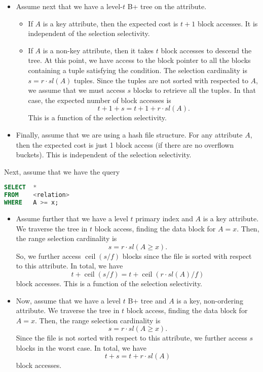 \documentclass[a4paper, openany]{memoir}
\theoremstyle{definition}
\theoremstyle{plain}
\begin{document}
\begin{itemize}
    \item Assume next that we have a level-$t$ B+ tree on the attribute.
    \begin{itemize}
        \item If $A$ is a key attribute, then the expected cost is $t + 1$ block accesses. It is independent of the selection selectivity.
        \item If $A$ is a non-key attribute, then it takes $t$ block accesses to descend the tree. At this point, we have access to the block pointer to all the blocks containing a tuple satisfying the condition. The selection cardinality is $s = r \cdot \textit{sl}(A)$ tuples. Since the tuples are not sorted with respected to $A$, we assume that we must access $s$ blocks to retrieve all the tuples. In that case, the expected number of block accesses is
        \[t + 1 + s = t + 1 + r \cdot \textit{sl}(A).\]
        This is a function of the selection selectivity.
    \end{itemize}

    \item Finally, assume that we are using a hash file structure. For any attribute $A$, then the expected cost is just 1 block access (if there are no overflown buckets). This is independent of the selection selectivity.
\end{itemize}

Next, assume that we have the query
\begin{lstlisting}[language=SQL]
SELECT  *
FROM    <relation>
WHERE   A >= x;
\end{lstlisting}
\begin{itemize}
    \item Assume further that we have a level $t$ primary index and $A$ is a key attribute. We traverse the tree in $t$ block access, finding the data block for $A = x$. Then, the range selection cardinality is 
    \[s = r \cdot \textit{sl}(A \geq x).\]
    So, we further access $\operatorname{ceil}(s/f)$ blocks since the file is sorted with respect to this attribute. In total, we have
    \[t + \operatorname{ceil}(s/f) = t + \operatorname{ceil}(r \cdot \textit{sl}(A)/f)\]
    block accesses. This is a function of the selection selectivity.
    \item Now, assume that we have a level $t$ B+ tree and $A$ is a key, non-ordering attribute. We traverse the tree in $t$ block access, finding the data block for $A = x$. Then, the range selection cardinality is
    \[s = r \cdot \textit{sl}(A \geq x).\]
    Since the file is not sorted with respect to this attribute, we further access $s$ blocks in the worst case. In total, we have
    \[t + s = t + r \cdot \textit{sl}(A)\]
    block accesses.
\end{itemize}
\newpage
\end{document}
